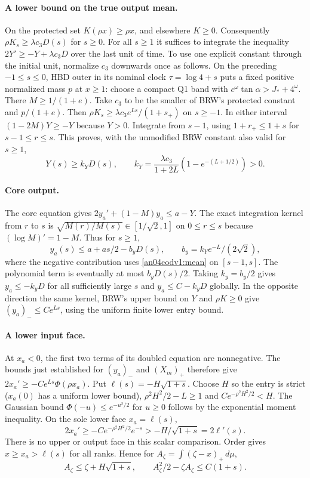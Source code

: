 \documentclass[11pt]{article}
\newcommand{\dd}{\,d}
\begin{document}
\paragraph{A lower bound on the true output mean.}
On the protected set $K(\rho x)\ge\rho x$, and elsewhere $K\ge0$.
Consequently $\rho K_s\ge\lambda c_3 D(s)$ for $s\ge0$.
For all $s\ge1$ it suffices to integrate the inequality
$2Y'\ge-Y+\lambda c_3D$ over the last unit of time.
To use one explicit constant through the initial unit, normalize
$c_3$ downwards once as follows. On the preceding $-1\le s\le0$,
HBD outer in its nominal clock $\tau=\log4+s$ puts a fixed positive
normalized mass $p$ at $x\ge1$: choose a compact Q1 band with
$c^\omega\tan\alpha>J_*+4^\omega$. There $M\ge1/(1+e)$.
Take $c_3$ to be the smaller of BRW's protected constant and
$p/(1+e)$. Then $\rho K_s\ge\lambda c_3 e^{Ls}/(1+s_+)$
on $s\ge-1$. In either interval $(1-2M)Y\ge-Y$ because $Y>0$.
Integrate from $s-1$, using $1+r_+\le1+s$ for $s-1\le r\le s$.
This proves, with the unmodified BRW constant also valid for $s\ge1$,
\begin{equation}\label{an04codv1:mean}
 Y(s)\ge k_Y D(s),\qquad
 k_Y=\frac{\lambda c_3}{1+2L}\left(1-e^{-(L+1/2)}\right)>0 .
\end{equation}

\paragraph{Core output.}
The core equation gives $2y_a'+(1-M)y_a\le a-Y$.
The exact integration kernel from $r$ to $s$ is
$\sqrt{M(r)/M(s)}\in[1/\sqrt2,1]$ on $0\le r\le s$ because
$(\log M)'=1-M$. Thus for $s\ge1$,
\[
 y_a(s)\le a+as/2-b_yD(s),\qquad b_y=k_Ye^{-L}/(2\sqrt2),
\]
where the negative contribution uses \eqref{an04codv1:mean} on
$[s-1,s]$. The polynomial term is eventually at most $b_yD(s)/2$.
Taking $k_y=b_y/2$ gives $y_a\le-k_yD$ for all sufficiently large $s$
and $y_a\le C-k_yD$ globally. In the opposite direction the same
kernel, BRW's upper bound on $Y$ and $\rho K\ge0$ give
$(y_a)_-\le C e^{Ls}$, using the uniform finite lower entry bound.

\paragraph{A lower input face.}
At $x_a<0$, the first two terms of its doubled equation are
nonnegative. The bounds just established for $(y_a)_-$ and $(X_m)_+$
therefore give $2x_a'\ge-Ce^{Ls}\Phi(\rho x_a)$.
Put $\ell(s)=-H\sqrt{1+s}$. Choose $H$ so the entry is strict
($x_a(0)$ has a uniform lower bound), $\rho^2H^2/2-L\ge1$ and
$Ce^{-\rho^2H^2/2}<H$. The Gaussian bound
$\Phi(-u)\le e^{-u^2/2}$ for $u\ge0$ follows by the exponential
moment inequality. On the sole lower face $x_a=\ell(s)$,
\[
 2x_a'\ge-Ce^{-\rho^2H^2/2}e^{-s}>
 -H/\sqrt{1+s}=2\ell'(s).
\]
There is no upper or output face in this scalar comparison.
Order gives $x\ge x_a>\ell(s)$ for all ranks. Hence for
$A_\zeta=\int(\zeta-x)_+\dd\mu$,
\begin{equation}\label{an04codv1:exposure}
 A_\zeta\le \zeta+H\sqrt{1+s},\qquad
 A_\zeta^2/2-\zeta A_\zeta\le C(1+s).
\end{equation}
\end{document}
